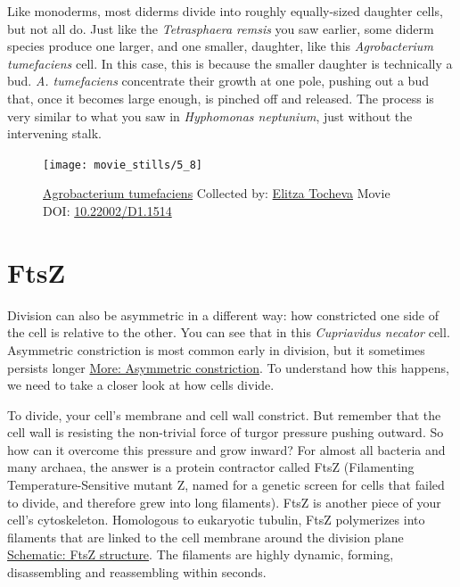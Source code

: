 \documentclass[]{tufte-book}
\begin{document}
Like monoderms, most diderms divide into roughly equally-sized daughter
cells, but not all do. Just like the \emph{Tetrasphaera remsis} you saw
earlier, some diderm species produce one larger, and one smaller,
daughter, like this \emph{Agrobacterium tumefaciens} cell. In this case,
this is because the smaller daughter is technically a bud. \emph{A.
tumefaciens} concentrate their growth at one pole, pushing out a bud
that, once it becomes large enough, is pinched off and released. The
process is very similar to what you saw in \emph{Hyphomonas neptunium},
just without the intervening stalk.





\begin{figure}
\texttt{[image: movie\_stills/5\_8]} \caption[\protect\hyperlink{tree}{Agrobacterium tumefaciens} Collected
by: \protect\hyperlink{elitza_tocheva}{Elitza Tocheva} Movie DOI:
\href{https://doi.org/10.22002/D1.1514}{10.22002/D1.1514}]{\protect\hyperlink{tree}{Agrobacterium tumefaciens} Collected
by: \protect\hyperlink{elitza_tocheva}{Elitza Tocheva} Movie DOI:
\href{https://doi.org/10.22002/D1.1514}{10.22002/D1.1514}}\label{fig:5-8}
\end{figure}

\section{FtsZ}\label{ftsz}

Division can also be asymmetric in a different way: how constricted one
side of the cell is relative to the other. You can see that in this
\emph{Cupriavidus necator} cell. Asymmetric constriction is most common
early in division, but it sometimes persists longer
\protect\hyperlink{Asymmetric_constriction}{More: Asymmetric
constriction}. To understand how this happens, we need to take a closer
look at how cells divide.

To divide, your cell's membrane and cell wall constrict. But remember
that the cell wall is resisting the non-trivial force of turgor pressure
pushing outward. So how can it overcome this pressure and grow inward?
For almost all bacteria and many archaea, the answer is a protein
contractor called FtsZ (Filamenting Temperature-Sensitive mutant Z,
named for a genetic screen for cells that failed to divide, and
therefore grew into long filaments). FtsZ is another piece of your
cell's cytoskeleton. Homologous to eukaryotic tubulin, FtsZ polymerizes
into filaments that are linked to the cell membrane around the division
plane \protect\hyperlink{FtsZ_structure}{Schematic: FtsZ structure}. The
filaments are highly dynamic, forming, disassembling and reassembling
within seconds.
\end{document}
